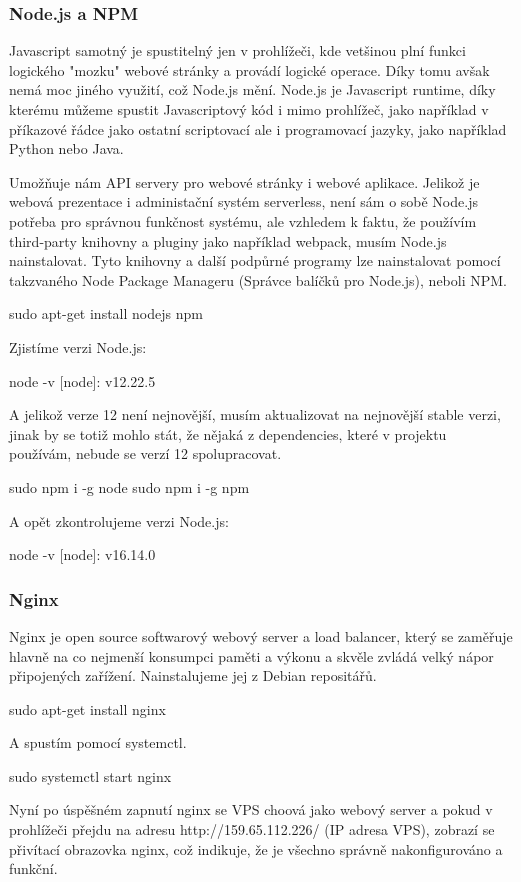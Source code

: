 \documentclass[12pt,a4paper]{report}
\begin{document}
  \subsubsection{Node.js a NPM}
  Javascript samotný je spustitelný jen v prohlížeči, kde vetšinou plní funkci logického "mozku" webové stránky a provádí logické operace. Díky tomu avšak nemá moc jiného využití, což Node.js mění.
  Node.js je Javascript runtime, díky kterému můžeme spustit Javascriptový kód i mimo prohlížeč, jako například v příkazové řádce jako ostatní scriptovací ale i programovací jazyky, jako například Python nebo Java.
 
  Umožňuje nám API servery pro webové stránky i webové aplikace. 
  Jelikož je webová prezentace i administační systém serverless, není sám o sobě Node.js potřeba pro správnou funkčnost systému, ale vzhledem k faktu, že
  používím third-party knihovny a pluginy jako například webpack, musím Node.js nainstalovat. Tyto knihovny a další podpůrné programy lze nainstalovat pomocí takzvaného Node Package Manageru (Správce balíčků pro Node.js), neboli NPM.
  \begin{bash}
    sudo apt-get install nodejs npm
  \end{bash}
  Zjistíme verzi Node.js:
  \begin{bash}
    node -v
    [node]: v12.22.5
  \end{bash}
  A jelikož verze 12 není nejnovější, musím aktualizovat na nejnovější stable verzi, jinak by se totiž mohlo stát, že nějaká z dependencies, které v projektu používám, nebude se verzí 12 spolupracovat.
  \begin{bash}
    sudo npm i -g node
    sudo npm i -g npm
  \end{bash}
  A opět zkontrolujeme verzi Node.js:
  \begin{bash}
    node -v
    [node]: v16.14.0
  \end{bash}
  \subsubsection{Nginx}
  Nginx je open source softwarový webový server a load balancer, který se zaměřuje hlavně na co
  nejmenší konsumpci paměti a výkonu a skvěle zvládá velký nápor připojených zařížení.
  Nainstalujeme jej z Debian repositářů.
  \begin{bash}
    sudo apt-get install nginx
  \end{bash}
  A spustím pomocí systemctl.
  \begin{bash}
    sudo systemctl start nginx
  \end{bash}
  Nyní po úspěšném zapnutí nginx se VPS choová jako webový server a pokud v prohlížeči přejdu na adresu http://159.65.112.226/ (IP adresa VPS), zobrazí se přivítací obrazovka nginx, což indikuje, že je všechno správně nakonfigurováno a funkční. 
\end{document}
